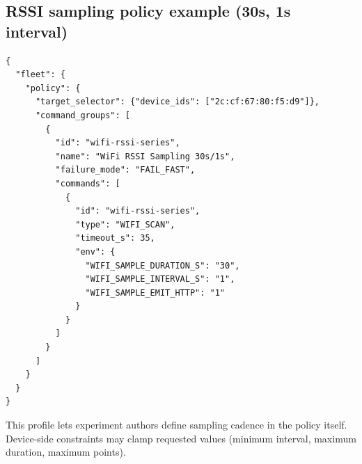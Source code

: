 \documentclass[11pt,a4paper]{article}
\begin{document}
\subsection{RSSI sampling policy example (30s, 1s interval)}
\begin{verbatim}
{
  "fleet": {
    "policy": {
      "target_selector": {"device_ids": ["2c:cf:67:80:f5:d9"]},
      "command_groups": [
        {
          "id": "wifi-rssi-series",
          "name": "WiFi RSSI Sampling 30s/1s",
          "failure_mode": "FAIL_FAST",
          "commands": [
            {
              "id": "wifi-rssi-series",
              "type": "WIFI_SCAN",
              "timeout_s": 35,
              "env": {
                "WIFI_SAMPLE_DURATION_S": "30",
                "WIFI_SAMPLE_INTERVAL_S": "1",
                "WIFI_SAMPLE_EMIT_HTTP": "1"
              }
            }
          ]
        }
      ]
    }
  }
}
\end{verbatim}

This profile lets experiment authors define sampling cadence in the policy itself.
Device-side constraints may clamp requested values (minimum interval, maximum duration, maximum points).
\end{document}
